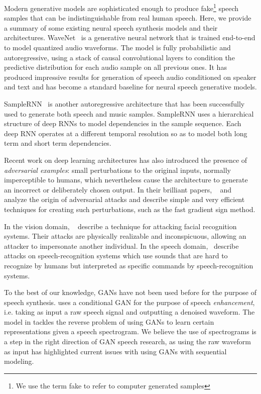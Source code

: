 Modern generative models are sophisticated enough to produce fake\footnote{We use the term fake to refer to
computer generated samples} speech samples that can be indistinguishable from real human speech. Here, we provide a summary of some existing neural speech synthesis models and their architectures.
WaveNet~\cite{van2016wavenet} is a generative neural network that is trained end-to-end
to model quantized audio waveforms. The model is fully
probabilistic and autoregressive, using a stack of causal convolutional layers
to condition the predictive distribution for each audio sample on all previous ones. It has produced impressive results for generation of speech audio conditioned on speaker and text and has become a standard baseline for neural speech generative models. 

SampleRNN~\cite{mehri2016samplernn} is another autoregressive architecture that
has been successfully used to generate both speech and music samples. SampleRNN
uses a hierarchical structure of deep RNNs to model dependencies in the sample
sequence. Each deep RNN operates at a different temporal resolution so as to
model both long term and short term dependencies. 


Recent work on deep learning architectures has also introduced the presence of \textit{adversarial examples}: small perturbations to the original inputs, normally imperceptible to humans, which nevertheless cause the architecture to generate an incorrect or deliberately chosen output. In their brilliant papers, ~\cite{szegedy2013intriguing} and
~\cite{goodfellow2014explaining} analyze the origin of adversarial attacks and
describe simple and very efficient techniques for creating such perturbations, such as the fast gradient sign method. 

In the vision domain, ~\cite{sharif2016accessorize} describe a technique for attacking facial recognition systems. Their attacks are physically realizable and inconspicuous, allowing an attacker to impersonate another individual. In the speech domain,~\cite{carlini2016hidden} describe attacks on speech-recognition systems which use sounds that are hard to recognize by humans but interpreted as specific commands by speech-recognition systems.

To the best of our knowledge, GANs have not been used before for the purpose of speech synthesis. \cite{pascual2017segan} uses a conditional GAN for the purpose of speech \textit{enhancement}, i.e. taking as input a raw speech signal and outputting a denoised waveform. The model in \cite{chang2017learning} tackles the reverse problem of using GANs to learn certain representations given a speech spectrogram. We believe the use of spectrograms is a step in the right direction of GAN speech research, as using the raw waveform as input has highlighted current issues with using GANs with sequential modeling.